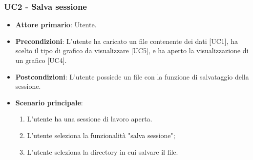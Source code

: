 \subsubsection{UC2 - Salva sessione}
\begin{itemize}
	\item \textbf{Attore primario}: Utente.
	\item \textbf{Precondizioni}: L'utente ha caricato un file contenente dei dati [UC1], ha scelto il tipo di grafico da visualizzare [UC5], e ha aperto la visualizzazione di un grafico [UC4].
	\item \textbf{Postcondizioni}: L'utente possiede un file con la funzione di salvataggio della sessione.
	\item \textbf{Scenario principale}:
		\begin{enumerate}
			\item L'utente ha una sessione di lavoro aperta.
			\item L'utente seleziona la funzionalità "salva sessione";
			\item L'utente seleziona la directory in cui salvare il file.
		\end{enumerate}
\end{itemize}